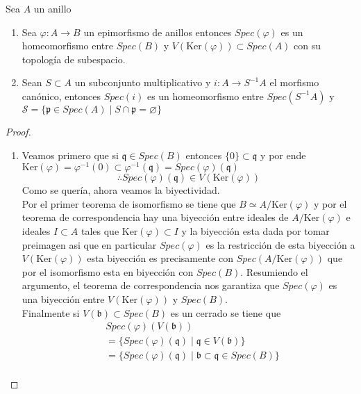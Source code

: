 \documentclass[14pt]{extarticle}
\begin{document}
\begin{proposicion}{}{}
    Sea $A$ un anillo
    \begin{enumerate}
        \item Sea $\varphi:A\rightarrow B$ un epimorfismo de anillos
        entonces $Spec(\varphi)$
        es un homeomorfismo entre $Spec(B)$ y $V(\mbox{Ker}(\varphi))\subset Spec(A)$
        con su topología de subespacio.
        \item Sean $S\subset A$ un subconjunto multiplicativo y
        $i:A\rightarrow S^{-1}A$ el morfismo canónico, entonces
        $Spec(i)$ es un homeomorfismo entre $Spec(S^{-1}A)$ y 
        $\mathcal{S}=\{\mathfrak{p}\in Spec(A)\mid S\cap \mathfrak{p} = \varnothing\}$
    \end{enumerate}
\end{proposicion}
\begin{proof}
    \begin{enumerate}
        \item Veamos primero que si $\mathfrak{q}\in Spec(B)$
        entonces $\{0\}\subset \mathfrak{q}$ y por ende 
        $\mbox{Ker}(\varphi)=\varphi^{-1}(0)\subset\varphi^{-1}(\mathfrak{q}) 
        = Spec(\varphi)(\mathfrak{q})$
        $$\therefore Spec(\varphi)(\mathfrak{q}) \in V(\mbox{Ker}(\varphi))$$
        Como se quería, ahora veamos la biyectividad.\\
        Por el primer teorema de isomorfismo se tiene que $B \simeq A/\mbox{Ker}(\varphi)$
        y por el teorema de correspondencia hay una biyección entre ideales de $A/\mbox{Ker}(\varphi)$
        e ideales $I\subset A$ tales que $\mbox{Ker}(\varphi)\subset I$ y la biyección esta dada por
        tomar preimagen asi que en particular $Spec(\varphi)$ es la restricción de esta biyección
        a $V(\mbox{Ker}(\varphi))$ esta biyección es precisamente con $Spec(A/\mbox{Ker}(\varphi))$ que 
        por el isomorfismo esta en biyección con $Spec(B)$. Resumiendo el argumento,
        el teorema de correspondencia nos garantiza que $Spec(\varphi)$ es una biyección entre
        $V(\mbox{Ker}(\varphi))$ y $Spec(B)$.\\
        Finalmente si $V(\mathfrak{b})\subset Spec(B)$ es un cerrado se tiene que 
        \begin{align*}
            &Spec(\varphi)(V(\mathfrak{b}))\\
            &=\{Spec(\varphi)(\mathfrak{q})\mid \mathfrak{q}\in V(\mathfrak{b})\}\\
            &=\{ Spec(\varphi)(\mathfrak{q})\mid \mathfrak{b}\subset \mathfrak{q} \in Spec(B)\}\\

\end{align*}
\end{enumerate}
\end{proof}
\end{document}

